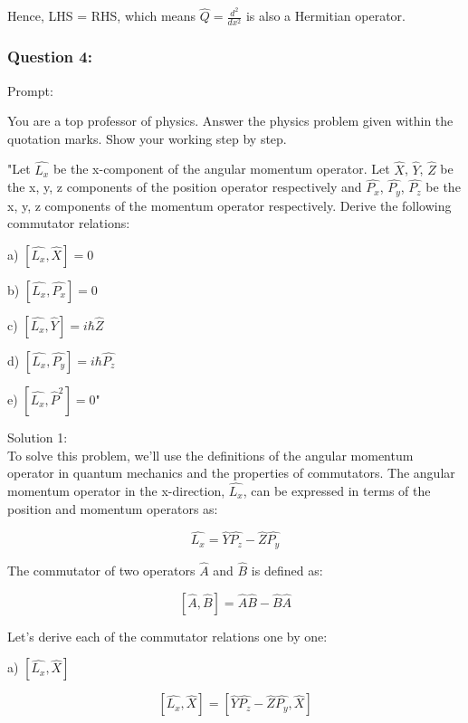 \documentclass[a4paper,11pt]{article}
\begin{document}
Hence, LHS = RHS, which means \( \hat{Q} = \frac{d^{2}}{dx^{2}} \) is also a Hermitian operator.

\subsubsection*{Question 4:}

Prompt:
\begin{spverbatim}
    You are a top professor of physics. Answer the physics problem given within the quotation marks. Show your working step by step.

    "Let \( \hat{L_{x}} \) be the x-component of the angular momentum operator. Let \( \hat{X} \), \( \hat{Y} \), \( \hat{Z} \) be the x, y, z components of the position operator respectively and \( \hat{P_{x}} \), \( \hat{P_{y}} \), \( \hat{P_{z}} \)  be the x, y, z components of the momentum operator respectively. Derive the following commutator relations:

    a) \( \left[ \hat{L_{x}}, \hat{X} \right] = 0 \)

    b) \( \left[ \hat{L_{x}}, \hat{P_{x}} \right] = 0 \)

    c) \( \left[ \hat{L_{x}}, \hat{Y} \right] = i \hbar \hat{Z} \)

    d) \( \left[ \hat{L_{x}}, \hat{P_{y}} \right] = i \hbar \hat{P_{z}} \)

    e) \( \left[ \hat{L_{x}}, \hat{P}^{2} \right] = 0 \)"
\end{spverbatim}

\bigskip

\noindent Solution 1: \\

To solve this problem, we'll use the definitions of the angular momentum operator in quantum mechanics and the properties of commutators. The angular momentum operator in the x-direction, \( \hat{L_{x}} \), can be expressed in terms of the position and momentum operators as:

\[ \hat{L_{x}} = \hat{Y}\hat{P_{z}} - \hat{Z}\hat{P_{y}} \]

The commutator of two operators \( \hat{A} \) and \( \hat{B} \) is defined as:

\[ \left[ \hat{A}, \hat{B} \right] = \hat{A}\hat{B} - \hat{B}\hat{A} \]

Let's derive each of the commutator relations one by one:

a) \( \left[ \hat{L_{x}}, \hat{X} \right] \)

\[ \left[ \hat{L_{x}}, \hat{X} \right] = \left[ \hat{Y}\hat{P_{z}} - \hat{Z}\hat{P_{y}}, \hat{X} \right] \]
\end{document}
